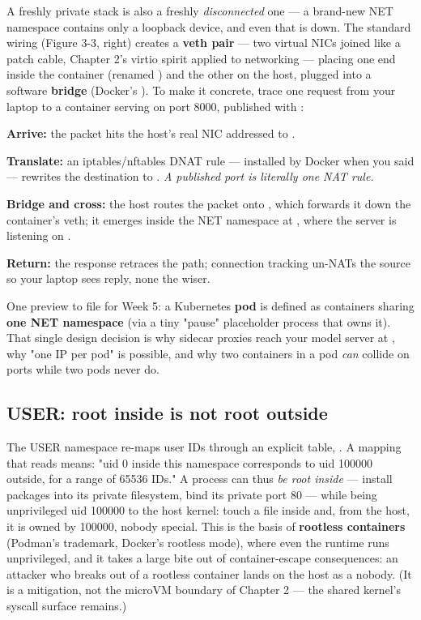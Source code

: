 A freshly private stack is also a freshly \textit{disconnected} one — a brand-new NET namespace contains only a loopback device, and even that is down. The standard wiring (Figure 3-3, right) creates a \textbf{veth pair} — two virtual NICs joined like a patch cable, Chapter 2's virtio spirit applied to networking — placing one end inside the container (renamed ) and the other on the host, plugged into a software \textbf{bridge} (Docker's ). To make it concrete, trace one request from your laptop to a container serving on port 8000, published with :

\begin{tbbitemize}
  \item \textbf{Arrive:} the packet hits the host's real NIC addressed to .
  \item \textbf{Translate:} an iptables/nftables DNAT rule — installed by Docker when you said  — rewrites the destination to . \textit{A published port is literally one NAT rule.}
  \item \textbf{Bridge and cross:} the host routes the packet onto , which forwards it down the container's veth; it emerges inside the NET namespace at , where the server is listening on .
  \item \textbf{Return:} the response retraces the path; connection tracking un-NATs the source so your laptop sees  reply, none the wiser.
\end{tbbitemize}

One preview to file for Week 5: a Kubernetes \textbf{pod} is defined as containers sharing \textbf{one NET namespace} (via a tiny "pause" placeholder process that owns it). That single design decision is why sidecar proxies reach your model server at , why "one IP per pod" is possible, and why two containers in a pod \textit{can} collide on ports while two pods never do.

\subsection*{USER: root inside is not root outside}

The USER namespace re-maps user IDs through an explicit table, . A mapping that reads  means: "uid 0 inside this namespace corresponds to uid 100000 outside, for a range of 65536 IDs." A process can thus \textit{be root inside} — install packages into its private filesystem, bind its private port 80 — while being unprivileged uid 100000 to the host kernel: touch a file inside and, from the host, it is owned by 100000, nobody special. This is the basis of \textbf{rootless containers} (Podman's trademark, Docker's rootless mode), where even the runtime runs unprivileged, and it takes a large bite out of container-escape consequences: an attacker who breaks out of a rootless container lands on the host as a nobody. (It is a mitigation, not the microVM boundary of Chapter 2 — the shared kernel's syscall surface remains.)

